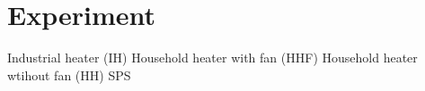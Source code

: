 \chapter{Experiment}
\label{ch:experiment}
Industrial heater (IH)
Household heater with fan (HHF)
Household heater wtihout fan (HH) 
SPS
\section{}
\label{}
\section{}
\label{}
\section{}
\label{}
